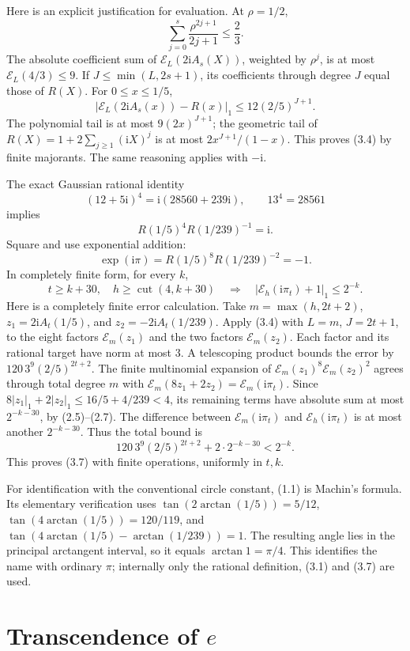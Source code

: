 \documentclass[11pt]{article}
\theoremstyle{definition}
\newcommand{\ii}{\mathrm i}
\newcommand{\Exp}{\mathcal E}
\newcommand{\cut}{\operatorname{cut}}
\begin{document}
Here is an explicit justification for evaluation. At \(\rho=1/2\),
\[
 \sum_{j=0}^s\frac{\rho^{2j+1}}{2j+1}\le\frac23.
\]
The absolute coefficient sum of
\(\Exp_L(2\ii A_s(X))\), weighted by \(\rho^j\), is at most
\(\Exp_L(4/3)\le9\). If \(J\le\min(L,2s+1)\), its coefficients through
degree \(J\) equal those of \(R(X)\). For \(0\le x\le1/5\),
\[
 \left|\Exp_L(2\ii A_s(x))-R(x)\right|_1
 \le 12(2/5)^{J+1}. \tag{3.4}
\]
The polynomial tail is at most \(9(2x)^{J+1}\); the geometric
tail of \(R(X)=1+2\sum_{j\ge1}(\ii X)^j\) is at most
\(2x^{J+1}/(1-x)\). This proves (3.4) by finite majorants.
The same reasoning applies with \(-\ii\).

The exact Gaussian rational identity
\[
 (12+5\ii)^4=\ii(28560+239\ii),\qquad 13^4=28561
 \tag{3.5}
\]
implies
\[
 R(1/5)^4R(1/239)^{-1}=\ii.
\]
Square and use exponential addition:
\[
 \exp(\ii\pi)=R(1/5)^8R(1/239)^{-2}=-1.
 \tag{3.6}
\]
In completely finite form, for every \(k\),
\[
 t\ge k+30,\quad h\ge\cut(4,k+30)
 \quad\Longrightarrow\quad
 |\Exp_h(\ii\pi_t)+1|_1\le2^{-k}. \tag{3.7}
\]
Here is a completely finite error calculation.
Take \(m=\max(h,2t+2)\), \(z_1=2\ii A_t(1/5)\), and
\(z_2=-2\ii A_t(1/239)\).
Apply (3.4) with \(L=m\), \(J=2t+1\), to the eight factors
\(\Exp_m(z_1)\) and the two factors \(\Exp_m(z_2)\).
Each factor and its rational target have norm at most \(3\).
A telescoping product bounds the error by
\(120\,3^9(2/5)^{2t+2}\).
The finite multinomial expansion of
\(\Exp_m(z_1)^8\Exp_m(z_2)^2\) agrees through total degree \(m\)
with \(\Exp_m(8z_1+2z_2)=\Exp_m(\ii\pi_t)\).
Since \(8|z_1|_1+2|z_2|_1\le16/5+4/239<4\), its remaining
terms have absolute sum at most \(2^{-k-30}\), by (2.5)--(2.7).
The difference between \(\Exp_m(\ii\pi_t)\) and
\(\Exp_h(\ii\pi_t)\) is at most another \(2^{-k-30}\).
Thus the total bound is
\[
 120\,3^9(2/5)^{2t+2}+2\cdot2^{-k-30}<2^{-k}.
\]
This proves (3.7) with finite operations, uniformly in \(t,k\).

For identification with the conventional circle constant, (1.1) is
Machin's formula. Its elementary verification uses
\(\tan(2\arctan(1/5))=5/12\),
\(\tan(4\arctan(1/5))=120/119\), and
\(\tan(4\arctan(1/5)-\arctan(1/239))=1\).
The resulting angle lies in the principal arctangent interval, so it
equals \(\arctan1=\pi/4\).
This identifies the name with ordinary \(\pi\); internally only the
rational definition, (3.1) and (3.7) are used.



\section{Transcendence of \texorpdfstring{\(e\)}{e}}\label{sec:e}
\end{document}
